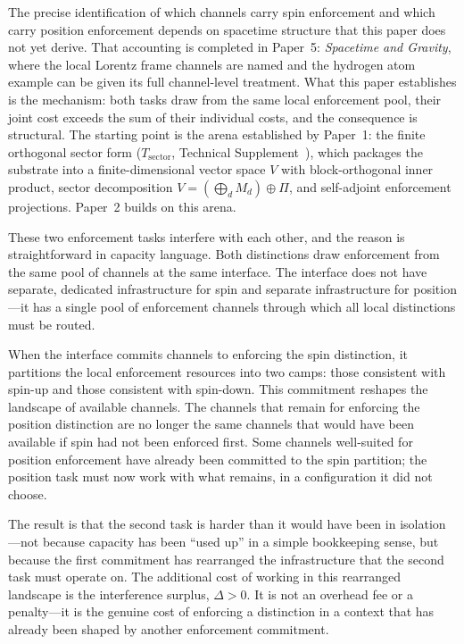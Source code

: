 \documentclass[11pt]{article}
\begin{document}
The precise identification of which channels carry spin enforcement and which carry position enforcement depends on spacetime structure that this paper does not yet derive.  That accounting is completed in Paper~5: \emph{Spacetime and Gravity}, where the local Lorentz frame channels are named and the hydrogen atom example can be given its full channel-level treatment.  What this paper establishes is the mechanism: both tasks draw from the same local enforcement pool, their joint cost exceeds the sum of their individual costs, and the consequence is structural.  The starting point is the arena established by Paper~1: the finite orthogonal sector form ($T_{\mathrm{sector}}$, Technical Supplement~\cite{BrookeSupplement}), which packages the substrate into a finite-dimensional vector space $V$ with block-orthogonal inner product, sector decomposition $V = (\bigoplus_d M_d) \oplus \Pi$, and self-adjoint enforcement projections.  Paper~2 builds on this arena.

These two enforcement tasks interfere with each other, and the reason is straightforward in capacity language.  Both distinctions draw enforcement from the same pool of channels at the same interface.  The interface does not have separate, dedicated infrastructure for spin and separate infrastructure for position---it has a single pool of enforcement channels through which all local distinctions must be routed.

When the interface commits channels to enforcing the spin distinction, it partitions the local enforcement resources into two camps: those consistent with spin-up and those consistent with spin-down.  This commitment reshapes the landscape of available channels.  The channels that remain for enforcing the position distinction are no longer the same channels that would have been available if spin had not been enforced first.  Some channels well-suited for position enforcement have already been committed to the spin partition; the position task must now work with what remains, in a configuration it did not choose.

The result is that the second task is harder than it would have been in isolation---not because capacity has been ``used up'' in a simple bookkeeping sense, but because the first commitment has rearranged the infrastructure that the second task must operate on.  The additional cost of working in this rearranged landscape is the interference surplus, $\Delta > 0$.  It is not an overhead fee or a penalty---it is the genuine cost of enforcing a distinction in a context that has already been shaped by another enforcement commitment.
\end{document}
